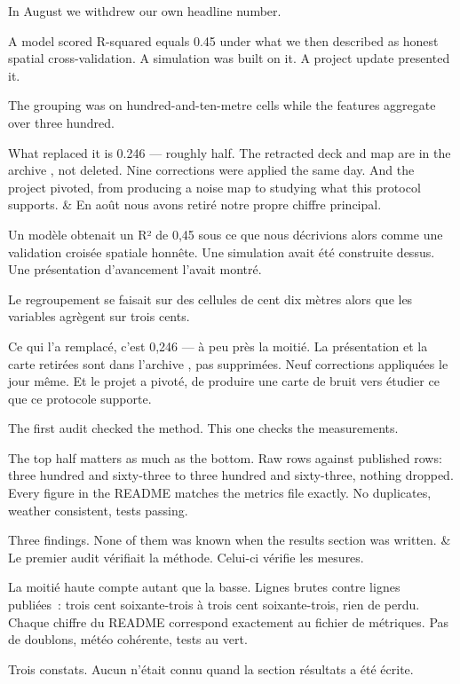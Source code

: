 \documentclass[10pt,a4paper]{article}
\begin{document}
\begin{say}
In August we withdrew our own headline number.

A model scored R-squared equals 0.45 under what we then described as honest
spatial cross-validation. A simulation was built on it. A project update
presented it.

The grouping was on hundred-and-ten-metre cells while the features aggregate over
three hundred. 

What replaced it is 0.246 --- roughly half. The retracted deck and map are in the
archive , not deleted. Nine corrections were
applied the same day. And the project pivoted, from producing a noise map to
studying what this protocol supports.
&
En août nous avons retiré notre propre chiffre principal.

Un modèle obtenait un R² de 0,45 sous ce que nous décrivions alors comme une
validation croisée spatiale honnête. Une simulation avait été construite dessus.
Une présentation d'avancement l'avait montré.

Le regroupement se faisait sur des cellules de cent dix mètres alors que les
variables agrègent sur trois cents. 

Ce qui l'a remplacé, c'est 0,246 --- à peu près la moitié. La présentation et la
carte retirées sont dans l'archive , pas supprimées. Neuf
corrections appliquées le jour même. Et le projet a pivoté, de produire une carte
de bruit vers étudier ce que ce protocole supporte.
\end{say}

\begin{say}
The first audit checked the method. This one checks the measurements.

The top half matters as much as the bottom. Raw rows against published rows:
three hundred and sixty-three to three hundred and sixty-three, nothing dropped.
Every figure in the README matches the metrics file exactly. No duplicates, weather
consistent, tests passing.

 Three
findings. None of them was known when the results section was written.
&
Le premier audit vérifiait la méthode. Celui-ci vérifie les mesures.

La moitié haute compte autant que la basse. Lignes brutes contre lignes
publiées~: trois cent soixante-trois à trois cent soixante-trois, rien de perdu.
Chaque chiffre du README correspond exactement au fichier de métriques. Pas de
doublons, météo cohérente, tests au vert.

 Trois
constats. Aucun n'était connu quand la section résultats a été écrite.
\end{say}
\end{document}

